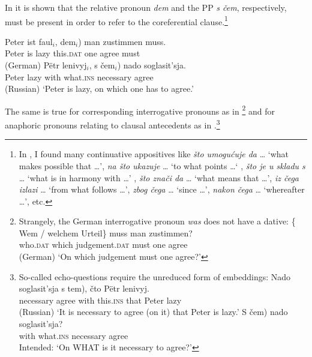 \documentclass[output=paper,
colorlinks,
citecolor=brown,
newtxmath
]{langscibook}
\begin{document}
\noindent In  it is shown that the relative pronoun \textit{dem} and the PP \textit{s čem}, respectively, must be present in order to refer to the coreferential clause.\footnote{In \citet{Willer-Gold2013}, I found many continuative appositives like \textit{što umogućuje da} {\dots} `what makes possible that {\dots}', \textit{na što ukazuje} {\dots} `to what points {\dots}‘ , \textit{što je u skladu s} {\dots} `what is in harmony with {\dots}' , \textit{što znači da} {\dots} `what means that {\dots}', \textit{iz čega izlazi} {\dots} `from what follows {\dots}', \textit{zbog čega} {\dots} `since {\dots}', \textit{nakon čega} {\dots} `whereafter {\dots}', etc.}

\ea\label{ex:9}
    \ea \gll Peter ist faul$_i$, \minsp{*(} dem$_i$) man zustimmen muss.\\
    Peter is lazy {} this.\textsc{dat} one agree must \\ \hfill (German)
    \ex \gll Pëtr lenivyj$_i$, \minsp{*(} s čem$_i$) nado soglasit'sja. \\
    Peter lazy {} with what.\textsc{ins} necessary agree \\ \hfill (Russian)
    \z
    \glt `Peter is lazy, on which one has to agree.'
\z

\noindent The same is true for corresponding interrogative pronouns as in \footnote{Strangely, the German interrogative pronoun \textit{was} does not have a dative:
                \ea\label{ex:footnote23}
                \gll \{\minsp{*} Wem / {welchem Urteil}\} muss man zustimmen? \\
                {} who.\textsc{dat} {} {which judgement}.\textsc{dat} must one agree \\ \hfill (German)
                \glt `On which judgement must one agree?'
                \z}
and for anaphoric pronouns relating to clausal antecedents as in .\footnote{So-called echo-questions \citep[see][]{BeckReis2018} require the unreduced form of embeddings:
    \ea
        \ea \gll Nado soglasit'sja \minsp{(} s tem), čto Pëtr lenivyj.\\
        necessary agree {} with this.\textsc{ins} that Peter lazy\\ \hfill (Russian)
        \glt `It is necessary to agree (on it) that Peter is lazy.'
        \ex \gll \minsp{*(} S čem) nado soglasit'sja?\\
        {} with what.\textsc{ins} necessary agree\\
        \glt Intended: `On WHAT is it necessary to agree?'
    \z\z
}
\end{document}
